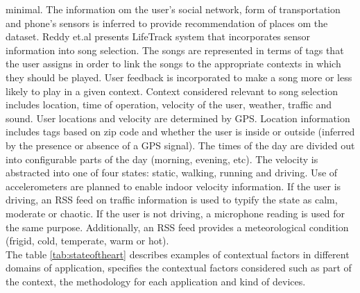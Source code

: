 minimal. The information  om the user's social network, form of
transportation and phone's sensors is inferred to provide
recommendation of places  om the dataset.
Reddy et.al\cite{reddy2006lifetrak} presents LifeTrack system that
incorporates sensor information into song selection. The songs are
represented in terms of tags that the user assigns in order to link
the songs to the appropriate contexts in which they should be played.
User feedback is incorporated to make a song more or less likely to
play in a given context. Context considered relevant to song selection
includes location, time of operation, velocity of the user, weather,
traffic and sound. User locations and velocity are determined by GPS.
Location information includes tags based on zip code and whether the
user is inside or outside (inferred by the presence or absence of a
GPS signal). The times of the day are divided out into configurable
parts of the day (morning, evening, etc). The velocity is abstracted
into one of four states: static, walking, running and driving. Use of
accelerometers are planned to enable indoor velocity information. If
the user is driving, an RSS feed on traffic information is used to
typify the state as calm, moderate or chaotic. If the user is not
driving, a microphone reading is used for the same purpose.
Additionally, an RSS feed provides a meteorological condition (frigid,
cold, temperate, warm or hot).\\ The table \ref{tab:stateoftheart}  
describes examples of contextual factors in different domains 
of application, specifies the contextual factors considered 
such as  part of the context, the methodology for each 
application and  kind of devices.

